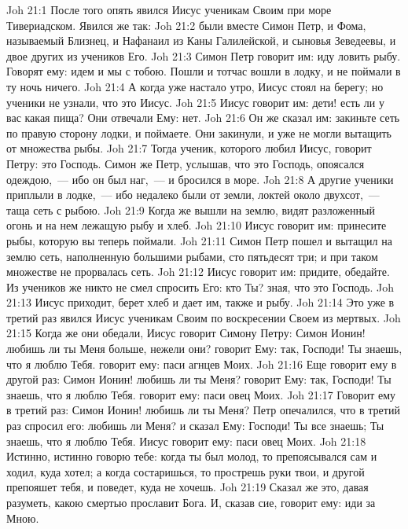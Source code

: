 \vs Joh 21:1 После того опять явился Иисус ученикам Своим при море Тивериадском. Явился же так:
\vs Joh 21:2 были вместе Симон Петр, и Фома, называемый Близнец, и Нафанаил из Каны Галилейской, и сыновья Зеведеевы, и двое других из учеников Его.
\vs Joh 21:3 Симон Петр говорит им: иду ловить рыбу. Говорят ему: идем и мы с тобою. Пошли и тотчас вошли в лодку, и не поймали в ту ночь ничего.
\vs Joh 21:4 А когда уже настало утро, Иисус стоял на берегу; но ученики не узнали, что это Иисус.
\vs Joh 21:5 Иисус говорит им: дети! есть ли у вас какая пища? Они отвечали Ему: нет.
\vs Joh 21:6 Он же сказал им: закиньте сеть по правую сторону лодки, и поймаете. Они закинули, и уже не могли вытащить  от множества рыбы.
\vs Joh 21:7 Тогда ученик, которого любил Иисус, говорит Петру: это Господь. Симон же Петр, услышав, что это Господь, опоясался одеждою,~--- ибо он был наг,~--- и бросился в море.
\vs Joh 21:8 А другие ученики приплыли в лодке,~--- ибо недалеко были от земли, локтей около двухсот,~--- таща сеть с рыбою.
\vs Joh 21:9 Когда же вышли на землю, видят разложенный огонь и на нем лежащую рыбу и хлеб.
\vs Joh 21:10 Иисус говорит им: принесите рыбы, которую вы теперь поймали.
\vs Joh 21:11 Симон Петр пошел и вытащил на землю сеть, наполненную большими рыбами,  сто пятьдесят три; и при таком множестве не прорвалась сеть.
\vs Joh 21:12 Иисус говорит им: придите, обедайте. Из учеников же никто не смел спросить Его: кто Ты? зная, что это Господь.
\vs Joh 21:13 Иисус приходит, берет хлеб и дает им, также и рыбу.
\vs Joh 21:14 Это уже в третий раз явился Иисус ученикам Своим по воскресении Своем из мертвых.
\rsbpar\vs Joh 21:15 Когда же они обедали, Иисус говорит Симону Петру: Симон Ионин! любишь ли ты Меня больше, нежели они?  говорит Ему: так, Господи! Ты знаешь, что я люблю Тебя.  говорит ему: паси агнцев Моих.
\vs Joh 21:16 Еще говорит ему в другой раз: Симон Ионин! любишь ли ты Меня?  говорит Ему: так, Господи! Ты знаешь, что я люблю Тебя.  говорит ему: паси овец Моих.
\vs Joh 21:17 Говорит ему в третий раз: Симон Ионин! любишь ли ты Меня? Петр опечалился, что в третий раз спросил его: любишь ли Меня? и сказал Ему: Господи! Ты все знаешь; Ты знаешь, что я люблю Тебя. Иисус говорит ему: паси овец Моих.
\vs Joh 21:18 Истинно, истинно говорю тебе: когда ты был молод, то препоясывался сам и ходил, куда хотел; а когда состаришься, то прострешь руки твои, и другой препояшет тебя, и поведет, куда не хочешь.
\vs Joh 21:19 Сказал же это, давая разуметь, какою смертью  прославит Бога. И, сказав сие, говорит ему: иди за Мною.
